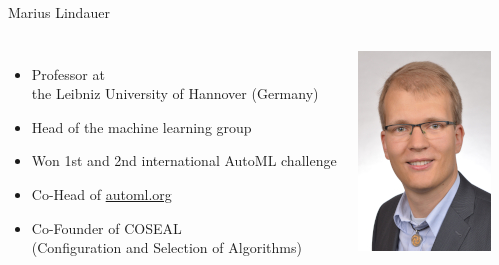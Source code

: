 \begin{frame}[c]{Marius Lindauer}

\begin{columns}
	
	
	\begin{itemize}
		\item Professor at\\ the Leibniz University of Hannover (Germany)
		\item Head of the machine learning group
		\item Won 1st and 2nd international AutoML challenge
		\item Co-Head of \url{automl.org}
		\item Co-Founder of COSEAL\\ (Configuration and Selection of Algorithms)
	\end{itemize}
	
	
	\includegraphics[width=1.0\textwidth]{images/lindauer.jpg}
	
\end{columns}

\end{frame}
